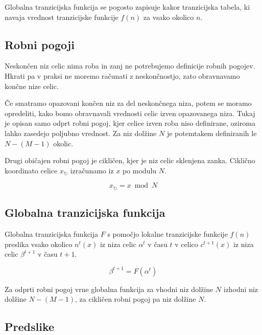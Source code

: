 \documentclass[12pt,a4paper,openany,twoside]{book}
\begin{document}
Globalna tranzicijska funkcija se pogosto zapisuje kakor tranzicijska tabela,
ki navaja vrednost tranzicijske funkcije \(f(n)\) za vsako okolico \(n\).

\subsection{Robni pogoji}

Neskončen niz celic nima roba in zanj ne potrebujemo definicije robnih pogojev.
Hkrati pa v praksi ne moremo računati z neskončnostjo,
zato obravnavamo končne nize celic.

Če smatramo opazovani končen niz za del neskončnega niza,
potem se moramo opredeliti, kako bomo obravnavali vrednosti celic izven opazovanega niza.
Tukaj je opisan samo odprt robni pogoj, kjer celice izven roba niso definirane,
oziroma lahko zasedejo poljubno vrednost.
Za niz dolžine \(N\) je potemtakem definiranih le \(N-(M-1)\) okolic.

Drugi običajen robni pogoj je cikličen, kjer je niz celic sklenjena zanka.
Ciklično koordinato celice \(x_{\circlearrowright}\) izračunamo iz \(x\) po modulu \(N\).

\begin{equation}
x_{\circlearrowright} = x \bmod N
\end{equation}

\subsection{Globalna tranzicijska funkcija}

Globalna tranzicijska funkcija \(F\) s pomočjo lokalne tranzicijske funkcije \(f(n)\)
preslika vsako okolico \(n^t(x)\) iz niza celic \(\alpha^t\) v času \(t\)
v celico \(c^{t+1}(x)\) iz niza celic \(\beta^{t+1}\) v času \(t+1\).

\begin{equation}
\beta^{t+1} = F (\alpha^t)
\end{equation}

Za odprti robni pogoj vrne globalna funkcija za vhodni niz dolžine \(N\)
izhodni niz dolžine \(N-(M-1)\), za cikličen robni pogoj pa niz dolžine \(N\).

\subsection{Predslike}
\end{document}
